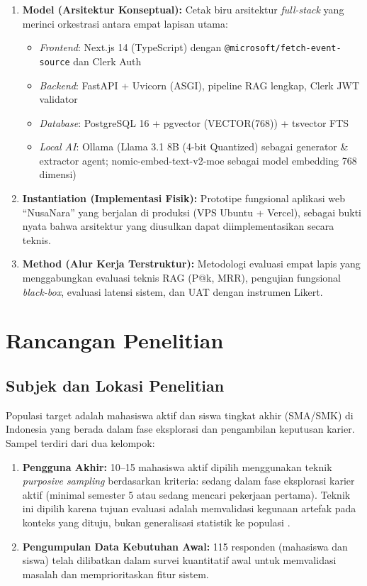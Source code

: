 \begin{enumerate}
  \item \textbf{Model (Arsitektur Konseptual):} Cetak biru arsitektur \textit{full-stack}
    yang merinci orkestrasi antara empat lapisan utama:
    \begin{itemize}[noitemsep]
      \item \textit{Frontend}: Next.js 14 (TypeScript) dengan \texttt{@microsoft/fetch-event-source} dan Clerk Auth
      \item \textit{Backend}: FastAPI + Uvicorn (ASGI), pipeline RAG lengkap, Clerk JWT validator
      \item \textit{Database}: PostgreSQL 16 + pgvector (VECTOR(768)) + tsvector FTS
      \item \textit{Local AI}: Ollama (Llama 3.1 8B (4-bit Quantized) sebagai generator \& extractor agent;
        nomic-embed-text-v2-moe sebagai model embedding 768 dimensi)
    \end{itemize}

  \item \textbf{Instantiation (Implementasi Fisik):} Prototipe fungsional aplikasi web
    ``NusaNara'' yang berjalan di produksi (VPS Ubuntu + Vercel), sebagai bukti nyata
    bahwa arsitektur yang diusulkan dapat diimplementasikan secara teknis.

  \item \textbf{Method (Alur Kerja Terstruktur):} Metodologi evaluasi empat lapis yang
    menggabungkan evaluasi teknis RAG (P@k, MRR), pengujian fungsional \textit{black-box},
    evaluasi latensi sistem, dan UAT dengan instrumen Likert.
\end{enumerate}

\section{Rancangan Penelitian}
\subsection{Subjek dan Lokasi Penelitian}
Populasi target adalah mahasiswa aktif dan siswa tingkat akhir (SMA/SMK) di Indonesia
yang berada dalam fase eksplorasi dan pengambilan keputusan karier. Sampel terdiri dari
dua kelompok:

\begin{enumerate}
  \item \textbf{Pengguna Akhir:} 10--15 mahasiswa aktif dipilih menggunakan teknik
    \textit{purposive sampling} berdasarkan kriteria: sedang dalam fase eksplorasi karier
    aktif (minimal semester 5 atau sedang mencari pekerjaan pertama). Teknik ini dipilih
    karena tujuan evaluasi adalah memvalidasi kegunaan artefak pada konteks yang dituju,
    bukan generalisasi statistik ke populasi \cite{Peffers2007}.

  \item \textbf{Pengumpulan Data Kebutuhan Awal:} 115 responden (mahasiswa dan siswa)
    telah dilibatkan dalam survei kuantitatif awal untuk memvalidasi masalah dan
    memprioritaskan fitur sistem.
\end{enumerate}

